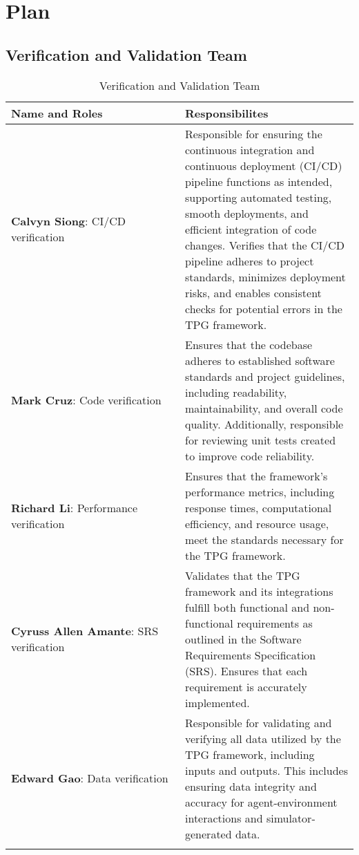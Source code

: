 \documentclass[12pt, titlepage]{article}
\begin{document}
\section{Plan}


\subsection{Verification and Validation Team}

\begin{longtable}{|p{0.5\linewidth}|p{0.5\linewidth}|}
  \toprule {\bf Name and Roles} & {\bf Responsibilites}\\
  \hline
  {\bf Calvyn Siong}: CI/CD verification & Responsible for ensuring the continuous integration and continuous deployment (CI/CD) pipeline functions as intended, supporting automated testing, smooth deployments, and efficient integration of code changes. Verifies that the CI/CD pipeline adheres to project standards, minimizes deployment risks, and enables consistent checks for potential errors in the TPG framework.\\
  \hline
  {\bf Mark Cruz}: Code verification & Ensures that the codebase adheres to established software standards and project guidelines, including readability, maintainability, and overall code quality. Additionally, responsible for reviewing unit tests created to improve code reliability.\\
  \hline

  {\bf Richard Li}: Performance verification &Ensures that the framework’s performance metrics, including response times, computational efficiency, and resource usage, meet the standards necessary for the TPG framework. \\
  \hline

  {\bf Cyruss Allen Amante}: SRS verification &Validates that the TPG framework and its integrations fulfill both functional and non-functional requirements as outlined in the Software Requirements Specification (SRS). Ensures that each requirement is accurately implemented.\\
  \hline
  {\bf Edward Gao}: Data verification & Responsible for validating and verifying all data utilized by the TPG framework, including inputs and outputs. This includes ensuring data integrity and accuracy for agent-environment interactions and simulator-generated data.\\
  \bottomrule
  \caption{Verification and Validation Team}
  \label{team}
\end{longtable}
\end{document}
